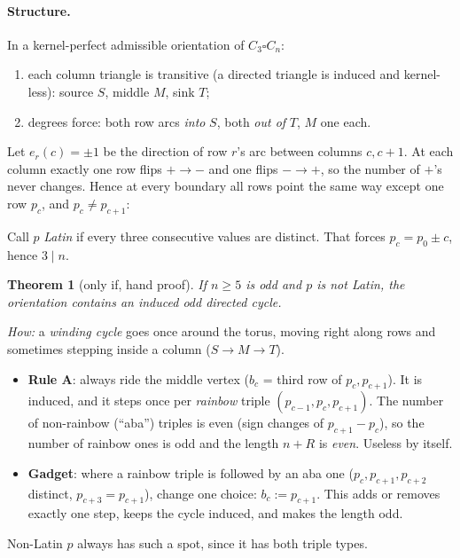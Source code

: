 \documentclass[11pt]{article}
\theoremstyle{plain}
\newtheorem{theorem}{Theorem}[section]
\theoremstyle{definition}
\newcommand{\T}{\square}
\begin{document}
\paragraph{Structure.} In a kernel-perfect admissible orientation of $C_3\T C_n$:
\begin{enumerate}[nosep]
\item each column triangle is transitive (a directed triangle is induced and kernel-less):
source $S$, middle $M$, sink $T$;
\item degrees force: both row arcs \emph{into} $S$, both \emph{out of} $T$, $M$ one each.
\end{enumerate}
Let $e_r(c)=\pm1$ be the direction of row $r$'s arc between columns $c,c+1$. At each column
exactly one row flips $+\to-$ and one flips $-\to+$, so the number of $+$'s never changes.
Hence at every boundary all rows point the same way except one row $p_c$, and $p_c\ne p_{c+1}$:

\begin{center}\end{center}

Call $p$ \emph{Latin} if every three consecutive values are distinct. That forces
$p_c=p_0\pm c$, hence $3\mid n$.

\begin{theorem}[only if, hand proof]
If $n\ge5$ is odd and $p$ is not Latin, the orientation contains an induced odd directed
cycle.
\end{theorem}
\emph{How:} a \emph{winding cycle} goes once around the torus, moving right along rows and
sometimes stepping inside a column ($S\to M\to T$).
\begin{itemize}[nosep]
\item \textbf{Rule A}: always ride the middle vertex ($b_c$ = third row of $p_c,p_{c+1}$). It
is induced, and it steps once per \emph{rainbow} triple $(p_{c-1},p_c,p_{c+1})$. The number of
non-rainbow (``aba'') triples is even (sign changes of $p_{c+1}-p_c$), so the number of
rainbow ones is odd and the length $n+R$ is \emph{even}. Useless by itself.
\item \textbf{Gadget}: where a rainbow triple is followed by an aba one ($p_c,p_{c+1},p_{c+2}$
distinct, $p_{c+3}=p_{c+1}$), change one choice: $b_c:=p_{c+1}$. This adds or removes exactly
one step, keeps the cycle induced, and makes the length odd.
\end{itemize}
Non-Latin $p$ always has such a spot, since it has both triple types.
\end{document}
